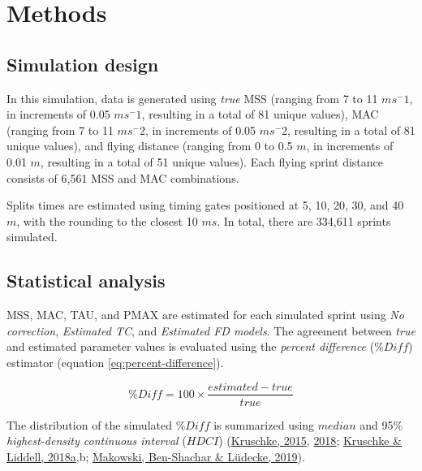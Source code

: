 \documentclass[fleqn,10pt,lineno]{wlpeerj} %
\begin{document}
\hypertarget{methods}{%
\section{Methods}\label{methods}}

\hypertarget{simulation-design}{%
\subsection{Simulation design}\label{simulation-design}}

In this simulation, data is generated using \emph{true} MSS (ranging from 7 to 11 \(ms^-1\), in increments of 0.05 \(ms^-1\), resulting in a total of 81 unique values), MAC (ranging from 7 to 11 \(ms^-2\), in increments of 0.05 \(ms^-2\), resulting in a total of 81 unique values), and flying distance (ranging from 0 to 0.5 \(m\), in increments of 0.01 \(m\), resulting in a total of 51 unique values). Each flying sprint distance consists of 6,561 MSS and MAC combinations.

Splits times are estimated using timing gates positioned at 5, 10, 20, 30, and 40 \(m\), with the rounding to the closest 10 \(ms\). In total, there are 334,611 sprints simulated.

\hypertarget{statistical-analysis}{%
\subsection{Statistical analysis}\label{statistical-analysis}}

MSS, MAC, TAU, and PMAX are estimated for each simulated sprint using \emph{No correction}, \emph{Estimated TC}, and \emph{Estimated FD models}. The agreement between \emph{true} and estimated parameter values is evaluated using the \emph{percent difference} (\(\%Diff\)) estimator (equation \eqref{eq:percent-difference}).

\begin{equation}
  \%Diff = 100 \times \frac{estimated - true}{true}  \label{eq:percent-difference}
\end{equation}

The distribution of the simulated \(\%Diff\) is summarized using \(median\) and 95\% \emph{highest-density continuous interval} (\(HDCI\)) (\protect\hyperlink{ref-kruschkeDoingBayesianData2015}{Kruschke, 2015}, \protect\hyperlink{ref-kruschkeRejectingAcceptingParameter2018}{2018}; \protect\hyperlink{ref-kruschkeBayesianDataAnalysis2018}{Kruschke \& Liddell, 2018a},b; \protect\hyperlink{ref-makowskiBayestestRDescribingEffects2019}{Makowski, Ben-Shachar \& Lüdecke, 2019}).
\end{document}
